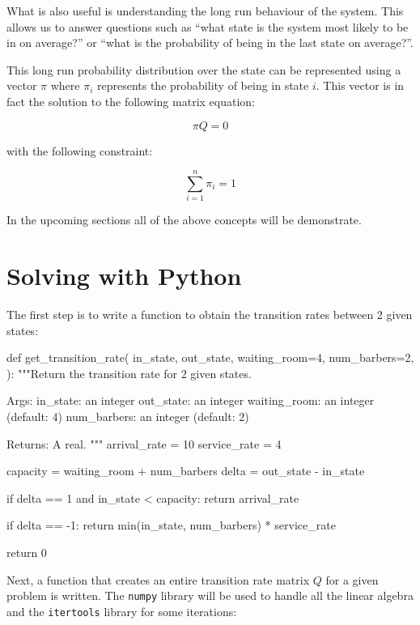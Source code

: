 What is also useful is understanding the long run behaviour of the
system. This allows us to answer questions such as ``what state is the system most
likely to be in on average?'' or ``what is the probability of being in the last
state on average?''.

This long run probability distribution over the state can be represented using a
vector \(\pi\) where \(\pi_i\) represents the probability of being in state
\(i\). This vector is in fact the solution to the following matrix equation:

\begin{equation}
    \pi Q = 0
    \label{eqn:continuous_time_markov_process_steady_state}
\end{equation}

with the following constraint:

\begin{equation}
    \sum_{i=1}^{n}\pi_i = 1
\end{equation}

In the upcoming sections all of the above concepts will be demonstrate.

\section{Solving with Python}\label{sec:solving-with-python}

The first step is to write a function to obtain the transition
rates between 2 given states:


\begin{pyin}
def get_transition_rate(
    in_state,
    out_state,
    waiting_room=4,
    num_barbers=2,
):
    """Return the transition rate for 2 given states.

    Args:
        in_state: an integer
        out_state: an integer
        waiting_room: an integer (default: 4)
        num_barbers:  an integer (default: 2)

    Returns:
        A real.
    """
    arrival_rate = 10
    service_rate = 4

    capacity = waiting_room + num_barbers
    delta = out_state - in_state

    if delta == 1 and in_state < capacity:
        return arrival_rate

    if delta == -1:
        return min(in_state, num_barbers) * service_rate

    return 0
\end{pyin}

Next, a function that creates an entire transition rate matrix \(Q\) for a given
problem is written. The \texttt{numpy} library will be used to
handle all the linear algebra and the \texttt{itertools} library for
some iterations:

